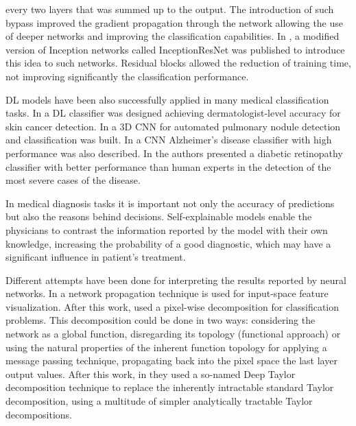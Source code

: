\documentclass[review]{elsarticle}
\theoremstyle{definition} %
\theoremstyle{remark}
\begin{document}
every two layers that was summed up to the output. The introduction of such bypass improved the gradient propagation through the network allowing the use of deeper networks and improving the classification capabilities. In \cite{szegedy2017inception}, a modified version of Inception networks called InceptionResNet was published to introduce this idea to such networks. Residual blocks allowed the reduction of training time, not improving significantly the classification performance. 
 
DL models have been also successfully applied  in many medical classification tasks. In \cite{esteva2017dermatologist} a DL classifier was designed achieving dermatologist-level accuracy for skin cancer detection. In \cite{wentao2018deeplung} a 3D CNN for automated pulmonary nodule detection and classification was built. In \cite{wang2018classification} a CNN Alzheimer's disease classifier with high performance was also described. In \cite{doi:10.1001/jama.2016.17216} the authors presented a diabetic retinopathy classifier with better performance than human experts in the detection of the most severe cases of the disease.

In medical diagnosis tasks it is important not only the accuracy of predictions but also the reasons behind decisions. Self-explainable models enable the physicians to contrast the information reported by the model with their own knowledge, increasing the probability of a good diagnostic, which may have a significant influence in patient's treatment.  

Different attempts have been done for interpreting the results reported by neural networks. In \cite{zeiler2014visualizing} a network propagation technique is used for input-space feature visualization. After this work, \cite{bach2015pixel} used a pixel-wise decomposition for classification problems. This decomposition could be done in two ways: considering the network as a global function, disregarding its topology (functional approach) or using the natural properties of the inherent function topology for applying a message passing technique, propagating back into the pixel space the last layer output values. After this work, in \cite{montavon2017explaining} they used a so-named Deep Taylor decomposition technique to replace the inherently intractable standard Taylor decomposition, using a multitude of simpler analytically tractable Taylor decompositions.
\end{document}
